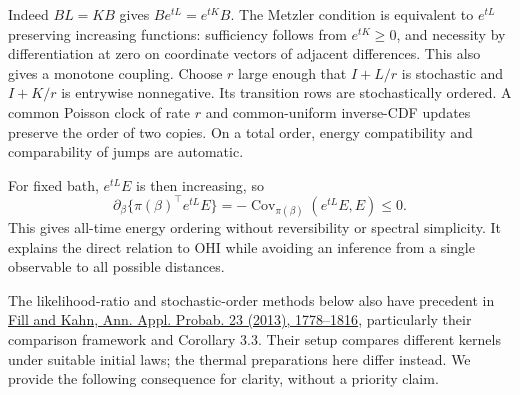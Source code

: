 \documentclass[11pt]{article}
\newcommand{\Cov}{\operatorname{Cov}}
\begin{document}
Indeed $BL=KB$ gives $Be^{tL}=e^{tK}B$. The Metzler condition is equivalent to $e^{tL}$ preserving increasing functions: sufficiency follows from $e^{tK}\geq0$, and necessity by differentiation at zero on coordinate vectors of adjacent differences. This also gives a monotone coupling. Choose $r$ large enough that $I+L/r$ is stochastic and $I+K/r$ is entrywise nonnegative. Its transition rows are stochastically ordered. A common Poisson clock of rate $r$ and common-uniform inverse-CDF updates preserve the order of two copies. On a total order, energy compatibility and comparability of jumps are automatic.

For fixed bath, $e^{tL}E$ is then increasing, so
\[
\partial_\beta\{\pi(\beta)^\top e^{tL}E\}
=-\Cov_{\pi(\beta)}(e^{tL}E,E)\leq0.
\]
This gives all-time energy ordering without reversibility or spectral simplicity. It explains the direct relation to OHI while avoiding an inference from a single observable to all possible distances.

The likelihood-ratio and stochastic-order methods below also have precedent in \href{https://arxiv.org/abs/1109.6075}{Fill and Kahn, Ann. Appl. Probab. 23 (2013), 1778--1816}, particularly their comparison framework and Corollary 3.3. Their setup compares different kernels under suitable initial laws; the thermal preparations here differ instead. We provide the following consequence for clarity, without a priority claim.
\end{document}
